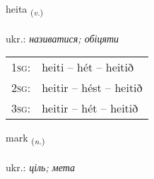 \documentclass[frontgrid, backgrid]{flacards}\usepackage[]{graphicx}\usepackage[]{xcolor}
\begin{document}
\renewcommand{\flhead}{\vskip5pt \fboxsep=0pt {\small\bfseries\footnotesize Sagnorð | дієслово}}
\renewcommand{\fcfoot}{\vskip5pt \fboxsep=0pt \hspace{2pt}{\small\bfseries\footnotesize 1K}}

\renewcommand{\blhead}{\vskip5pt {\small\bfseries\footnotesize Sagnorð | дієслово }}
\renewcommand{\bcfoot}{\vskip5pt \hspace{2pt}{\small\bfseries\footnotesize 1K}}


{heita \small{\textsubscript{(\textit{v.})}} \\[1ex] %
\textphonetic{[heiːta]} \\
ukr.: \emph{називатися; обіцяти} \\  [2ex]
\renewcommand*{\arraystretch}{0.8}
\begin{tabular}{p{1cm}l}
\textsc{1sg}: & heiti -- hét -- heitið \\ 
\textsc{2sg}: & heitir -- hést -- heitið \\ 
\textsc{3sg}: & heitir -- hét -- heitið \\ 
\end{tabular}
}

\renewcommand{\flhead}{\vskip5pt \fboxsep=0pt {\small\bfseries\footnotesize Nafnorð | іменник}}
\renewcommand{\fcfoot}{\vskip5pt \fboxsep=0pt \hspace{2pt}{\small\bfseries\footnotesize 1K}}

\renewcommand{\blhead}{\vskip5pt {\small\bfseries\footnotesize Nafnorð | іменник }}
\renewcommand{\bcfoot}{\vskip5pt \hspace{2pt}{\small\bfseries\footnotesize 1K}}


{mark \small{\textsubscript{(\textit{n.})}} \\[1ex] %
\textphonetic{[mar̥k]} \\
ukr.: \emph{ціль; мета} \\  [2ex]
\renewcommand*{\arraystretch}{0.8}
}
\end{document}
